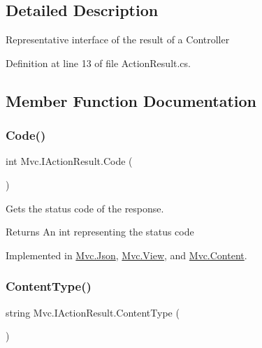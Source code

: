 \subsection{Detailed Description}
Representative interface of the result of a Controller 



Definition at line 13 of file Action\+Result.\+cs.



\subsection{Member Function Documentation}
\mbox{\label{interface_mvc_1_1_i_action_result_ab6b85ae50597587395df99b972c3d26b}} 
\subsubsection{\texorpdfstring{Code()}{Code()}}
{\footnotesize\ttfamily int Mvc.\+I\+Action\+Result.\+Code (\begin{DoxyParamCaption}{ }\end{DoxyParamCaption})}



Gets the status code of the response. 

\begin{DoxyReturn}{Returns}
An int representing the status code
\end{DoxyReturn}


Implemented in \hyperlink{class_mvc_1_1_json_aab9ce2b098ce0b4bfe8ad835a33e71d5}{Mvc.\+Json}, \hyperlink{class_mvc_1_1_view_a7e723a9bafb2f876175d1396c06da062}{Mvc.\+View}, and \hyperlink{class_mvc_1_1_content_a77175a25c002834c59e14cde60719c28}{Mvc.\+Content}.

\mbox{\label{interface_mvc_1_1_i_action_result_a8ad08f29bba90dfbe06d7a00465af10a}} 
\subsubsection{\texorpdfstring{Content\+Type()}{ContentType()}}
{\footnotesize\ttfamily string Mvc.\+I\+Action\+Result.\+Content\+Type (\begin{DoxyParamCaption}{ }\end{DoxyParamCaption})}



